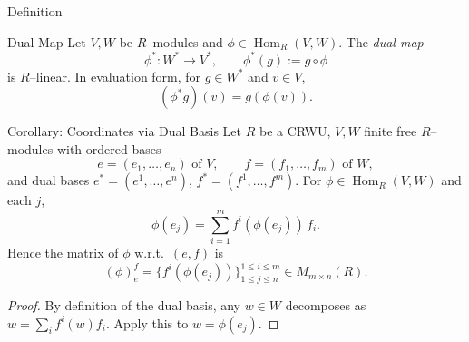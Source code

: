 \begin{frame}{Definition}
\begin{block}{Dual Map}
Let $V,W$ be $R$–modules and $\phi\in\operatorname{Hom}_R(V,W)$. The \emph{dual map}
\[
\phi^*:W^*\longrightarrow V^*,\qquad \phi^*(g):=g\circ \phi
\]
is $R$–linear. In evaluation form, for $g\in W^*$ and $v\in V$,
\[
(\phi^* g)(v) = g\left(\phi(v)\right).
\]    
\end{block}


\begin{center}
\end{center}
\end{frame}

\begin{frame}{Corollary: Coordinates via Dual Basis}
Let $R$ be a CRWU, $V,W$ finite free $R$–modules with ordered bases
\[
e=(e_1,\dots,e_n)\text{ of }V,\qquad f=(f_1,\dots,f_m)\text{ of }W,
\]
and dual bases $e^*=(e^1,\dots,e^n)$, $f^*=(f^1,\dots,f^m)$. For $\phi\in\operatorname{Hom}_R(V,W)$ and each $j$,
\[
\phi(e_j)=\sum_{i=1}^m f^i(\phi(e_j))\, f_i.
\]
Hence the matrix of $\phi$ w.r.t.\ $(e,f)$ is
\[
(\phi)_e^f=\big\{f^i(\phi(e_j))\big\}_{1\le j\le n}^{1\le i\le m}\in M_{m\times n}(R).
\]
\vspace{-0.2cm}
\begin{proof}
By definition of the dual basis, any $w\in W$ decomposes as $w=\sum_i f^i(w)f_i$. Apply this to $w=\phi(e_j)$.
\end{proof}
\end{frame}






